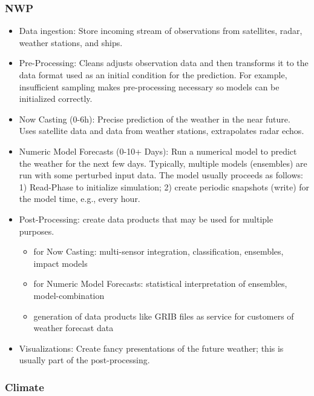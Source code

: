 \subsubsection{NWP}
\begin{itemize}
  \item Data ingestion: Store incoming stream of observations from satellites, radar, weather stations, and ships.
  \item Pre-Processing: Cleans adjusts observation data and then transforms it to the data format used as an initial condition for the prediction. 
    For example, insufficient sampling makes pre-processing necessary so models can be initialized correctly.
  \item Now Casting (0-6h): Precise prediction of the weather in the near future. 
    Uses satellite data and data from weather stations, extrapolates radar echos.
  \item Numeric Model Forecasts (0-10+ Days): Run a numerical model to predict the weather for the next few days. 
    Typically, multiple models (ensembles) are run with some perturbed input data. 	
    The model usually proceeds as follows: 1) Read-Phase to initialize simulation; 2) create periodic snapshots (write) for the model time, e.g., every hour.
    \item  Post-Processing: create data products that may be used for multiple purposes.
      \begin{itemize}
        \item for Now Casting: multi-sensor integration, classification, ensembles, impact models
        \item for Numeric Model Forecasts: statistical interpretation of ensembles, model-combination
        \item generation of data products like GRIB files as service for customers of weather forecast data
      \end{itemize}
    \item Visualizations: Create fancy presentations of the future weather; this is usually part of the post-processing.
\end{itemize}

\subsubsection{Climate}

